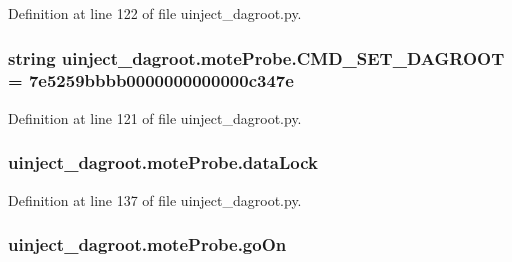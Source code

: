 Definition at line 122 of file uinject\+\_\+dagroot.\+py.

\subsubsection[{\texorpdfstring{C\+M\+D\+\_\+\+S\+E\+T\+\_\+\+D\+A\+G\+R\+O\+OT}{CMD_SET_DAGROOT}}]{\setlength{\rightskip}{0pt plus 5cm}string uinject\+\_\+dagroot.\+mote\+Probe.\+C\+M\+D\+\_\+\+S\+E\+T\+\_\+\+D\+A\+G\+R\+O\+OT = \textquotesingle{}7e5259bbbb0000000000000c347e\textquotesingle{}\hspace{0.3cm}{\ttfamily [static]}}\hypertarget{classuinject__dagroot_1_1mote_probe_a0c57db8232342abd02c69898e5fa3596}{}\label{classuinject__dagroot_1_1mote_probe_a0c57db8232342abd02c69898e5fa3596}


Definition at line 121 of file uinject\+\_\+dagroot.\+py.

\subsubsection[{\texorpdfstring{data\+Lock}{dataLock}}]{\setlength{\rightskip}{0pt plus 5cm}uinject\+\_\+dagroot.\+mote\+Probe.\+data\+Lock}\hypertarget{classuinject__dagroot_1_1mote_probe_abf921c7d25ef8615699451f39745c446}{}\label{classuinject__dagroot_1_1mote_probe_abf921c7d25ef8615699451f39745c446}


Definition at line 137 of file uinject\+\_\+dagroot.\+py.

\subsubsection[{\texorpdfstring{go\+On}{goOn}}]{\setlength{\rightskip}{0pt plus 5cm}uinject\+\_\+dagroot.\+mote\+Probe.\+go\+On}\hypertarget{classuinject__dagroot_1_1mote_probe_abb58a28a211f36327d1d5db897f50f94}{}\label{classuinject__dagroot_1_1mote_probe_abb58a28a211f36327d1d5db897f50f94}


